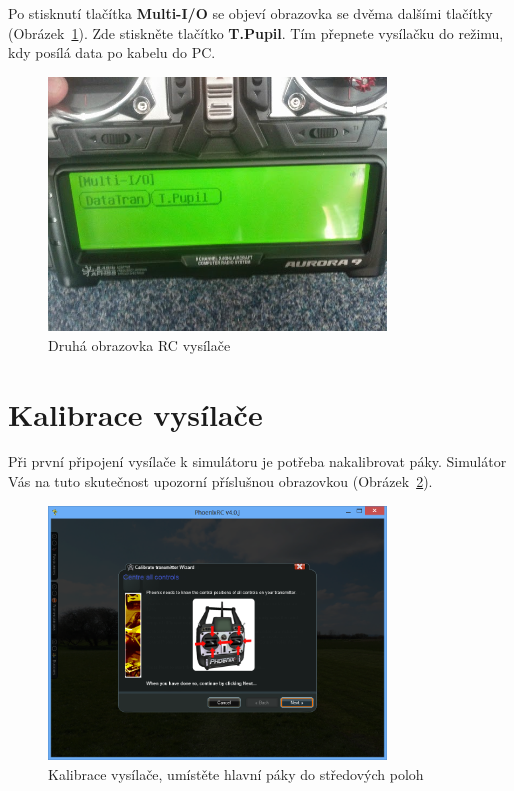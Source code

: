 \documentclass[11pt, a4paper]{article}
\begin{document}
Po stisknutí tlačítka \textbf{Multi-I/O} se objeví obrazovka se dvěma dalšími tlačítky (Obrázek~\ref{fig:obr4}). Zde stiskněte tlačítko \textbf{T.Pupil}. Tím přepnete vysílačku do režimu, kdy posílá data po kabelu do PC.

\begin{figure}[h]
\begin{center}
\includegraphics[width=0.8\textwidth]{fig/rc2.jpg}
\caption{Druhá obrazovka RC vysílače}
\label{fig:obr4}
\end{center}
\end{figure}

\section{Kalibrace vysílače}

Při první připojení vysílače k simulátoru je potřeba nakalibrovat páky. Simulátor Vás na tuto skutečnost upozorní příslušnou obrazovkou (Obrázek~\ref{fig:obr5}).

\begin{figure}[h]
\begin{center}
\includegraphics[width=0.8\textwidth]{fig/3.PNG}
\caption{Kalibrace vysílače, umístěte hlavní páky do středových poloh}
\label{fig:obr5}
\end{center}
\end{figure}
\end{document}
